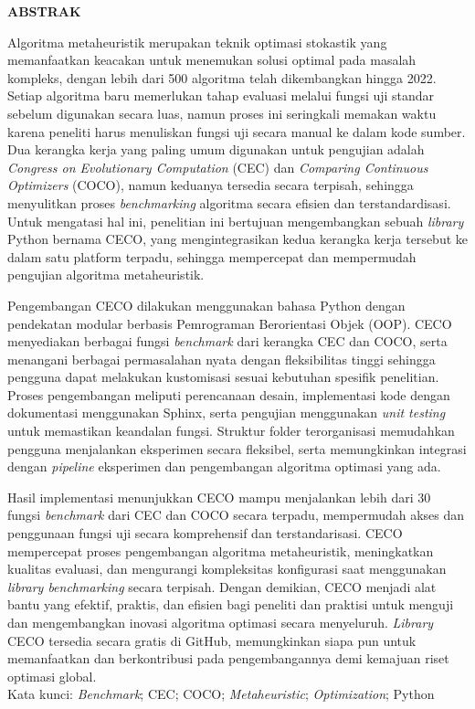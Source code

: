 
\clearpage
{}
{}
\begin{center}
    \large{\textbf{ABSTRAK}}\\[1cm]
\end{center}

Algoritma metaheuristik merupakan teknik optimasi stokastik yang memanfaatkan keacakan untuk menemukan solusi optimal pada masalah kompleks, dengan lebih dari 500 algoritma telah dikembangkan hingga 2022. Setiap algoritma baru memerlukan tahap evaluasi melalui fungsi uji standar sebelum digunakan secara luas, namun proses ini seringkali memakan waktu karena peneliti harus menuliskan fungsi uji secara manual ke dalam kode sumber. Dua kerangka kerja yang paling umum digunakan untuk pengujian adalah \textit{Congress on Evolutionary Computation} (CEC) dan \textit{Comparing Continuous Optimizers} (COCO), namun keduanya tersedia secara terpisah, sehingga menyulitkan proses \textit{benchmarking} algoritma secara efisien dan terstandardisasi. Untuk mengatasi hal ini, penelitian ini bertujuan mengembangkan sebuah \textit{library} Python bernama CECO, yang mengintegrasikan kedua kerangka kerja tersebut ke dalam satu platform terpadu, sehingga mempercepat dan mempermudah pengujian algoritma metaheuristik.

Pengembangan CECO dilakukan menggunakan bahasa Python dengan pendekatan modular berbasis Pemrograman Berorientasi Objek (OOP). CECO menyediakan berbagai fungsi \textit{benchmark} dari kerangka CEC dan COCO, serta menangani berbagai permasalahan nyata dengan fleksibilitas tinggi sehingga pengguna dapat melakukan kustomisasi sesuai kebutuhan spesifik penelitian. Proses pengembangan meliputi perencanaan desain, implementasi kode dengan dokumentasi menggunakan Sphinx, serta pengujian menggunakan \textit{unit testing} untuk memastikan keandalan fungsi. Struktur folder terorganisasi memudahkan pengguna menjalankan eksperimen secara fleksibel, serta memungkinkan integrasi dengan \textit{pipeline} eksperimen dan pengembangan algoritma optimasi yang ada.

Hasil implementasi menunjukkan CECO mampu menjalankan lebih dari 30 fungsi \textit{benchmark} dari CEC dan COCO secara terpadu, mempermudah akses dan penggunaan fungsi uji secara komprehensif dan terstandarisasi. CECO mempercepat proses pengembangan algoritma metaheuristik, meningkatkan kualitas evaluasi, dan mengurangi kompleksitas konfigurasi saat menggunakan \textit{library benchmarking} secara terpisah. Dengan demikian, CECO menjadi alat bantu yang efektif, praktis, dan efisien bagi peneliti dan praktisi untuk menguji dan mengembangkan inovasi algoritma optimasi secara menyeluruh. \textit{Library} CECO tersedia secara gratis di GitHub, memungkinkan siapa pun untuk memanfaatkan dan berkontribusi pada pengembangannya demi kemajuan riset optimasi global.\\[0.6cm]

\noindent Kata kunci: \textit{Benchmark}; CEC; COCO; \textit{Metaheuristic}; \textit{Optimization}; Python
